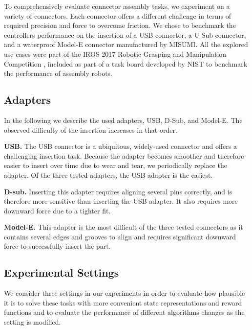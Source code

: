To comprehensively evaluate connector assembly tasks, we experiment on a variety of connectors. Each connector offers a different challenge in terms of required precision and force to overcome friction. 
We chose to benchmark the controllers performance on the insertion of a USB connector, a U-Sub connector, and a waterproof Model-E connector manufactured by MISUMI.
All the explored use cases were part of the IROS 2017 Robotic Grasping and Manipulation Competition \cite{roboticgrasping2017iros}, included as part of a task board developed by NIST to benchmark the performance of assembly robots.

\subsection{Adapters}
In the following we describe the used adapters, USB, D-Sub, and Model-E. The observed difficulty of the insertion increases in that order.

\textbf{USB.} The USB connector is a ubiquitous, widely-used connector and offers a challenging insertion task. Because the adapter becomes smoother and therefore easier to insert over time due to wear and tear, we periodically replace the adapter. Of the three tested adapters, the USB adapter is the easiest.

\textbf{D-sub.} Inserting this adapter requires aligning several pins correctly, and is therefore more sensitive than inserting the USB adapter. It also requires more downward force due to a tighter fit.

\textbf{Model-E.} This adapter is the most difficult of the three tested connectors as it contains several edges and grooves to align and requires significant downward force to successfully insert the part.

\subsection{Experimental Settings}
We consider three settings in our experiments in order to evaluate how plausible it is to solve these tasks with more convenient state representations and reward functions and to evaluate the performance of different algorithms changes as the setting is modified.

